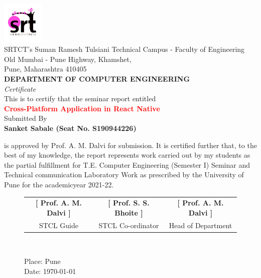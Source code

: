 \documentclass[12pt,a4paper]{report}
\begin{document}
\begin{center}
 \includegraphics[width=0.15\textwidth]{logo}
\\
{\Large SRTCT's Suman Ramesh Tulsiani Technical Campus - Faculty of Engineering}
\\
{\small Old Mumbai - Pune Highway, Khamshet,}
\\
{\small Pune, Maharashtra 410405}
\\
{\large \textbf{DEPARTMENT OF COMPUTER ENGINEERING}}
\\
{\LARGE \textit{Certificate}}
\\
{\large This is to certify that the seminar report entitled}
\\
{\large \textbf{ \textcolor{red}{Cross-Platform Application in React Native}}}
\\
{\large Submitted By}
\\
{\large \textbf{Sanket Sabale (Seat No. S190944226)}}
\\
\begin{FlushLeft}
 is approved by Prof. A. M. Dalvi for submission. It is certified further that, to the
best of my knowledge, the report represents work carried out by my
students as the partial fulfillment for T.E. Computer Engineering
(Semester I) Seminar and Technical communication Laboratory Work as 
prescribed by the University of Pune for the academicyear 2021-22.
\\

\end{FlushLeft}
\begin{figure}[b]
\begin{tabular}{ c c c }
 \textbf{[ Prof. A. M. Dalvi ]} & \textbf{[ Prof. S. S. Bhoite ]} &  \textbf{[ Prof. A. M. Dalvi ]}  \\ 
 STCL Guide & STCL Co-ordinator & Head of Department     
\end{tabular}
\\
\begin{FlushLeft}
{\small Place: Pune }\\
{\small Date: \today }
\end{FlushLeft}
\end{figure}


\end{center}
\end{document}
